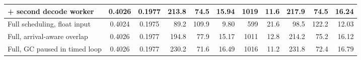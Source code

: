 \begin{table}[t]
\begin{tabular}{lcc rrrrr rrr}
+ second decode worker & 0.4026 & 0.1977 & 213.8 & 74.5 & 15.94 & 1019 & 11.6 & 217.9 & 74.5 & 16.24 \\ \midrule
Full scheduling, float input & 0.4024 & 0.1975 & 89.2 & 109.9 & 9.80 & 599 & 21.6 & 98.5 & 122.2 & 12.03 \\ \midrule
Full, arrival-aware overlap & 0.4026 & 0.1977 & 194.8 & 77.9 & 15.17 & 1011 & 12.8 & 214.2 & 75.2 & 16.12 \\
Full, GC paused in timed loop & 0.4026 & 0.1977 & 230.2 & 71.6 & 16.49 & 1016 & 11.2 & 231.8 & 72.4 & 16.79 \\
\bottomrule
\end{tabular}
\end{table}
